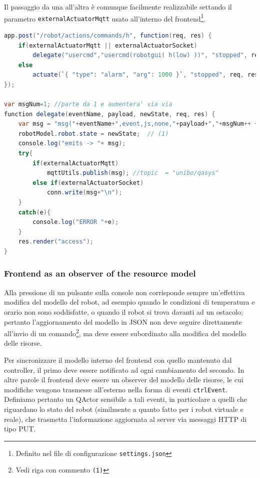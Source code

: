 \documentclass{../llncs}
\newcommand{\codescript}[1]{{\mbox{\small{\texttt{#1}}}}\xspace}
\newcommand{\labelsssec}[1]{\label{sssec:#1}}
\begin{document}
Il passaggio da una all'altra è comunque facilmente realizzabile settando il parametro \codescript{externalActuatorMqtt} usato all'interno del frontend\footnote{Definito nel file di configurazione \texttt{settings.json}}.\\

\begin{lstlisting}[language=java, caption={nodeCode/frontend/applCodeRobot.js}]
app.post("/robot/actions/commands/h", function(req, res) {
	if(externalActuatorMqtt || externalActuatorSocket)
		delegate("usercmd","usercmd(robotgui( h(low) ))", "stopped", req, res);
	else
		actuate(`{ "type": "alarm", "arg": 1000 }`, "stopped", req, res);
});

var msgNum=1; //parte da 1 e aumentera' via via
function delegate(eventName, payload, newState, req, res) {
	var msg = "msg("+eventName+",event,js,none,"+payload+","+msgNum++ +")";
	robotModel.robot.state = newState;	// (1)
	console.log("emits -> "+ msg);
	try{
		if(externalActuatorMqtt)
	 		mqttUtils.publish(msg);	//topic  = "unibo/qasys"
		else if(externalActuatorSocket)
			conn.write(msg+"\n");
	}
	catch(e){
		console.log("ERROR "+e);
	}
	res.render("access");
}
\end{lstlisting}

\subsubsection{Frontend as an observer of the resource model}
\labelsssec{frontendObserver}
Alla pressione di un pulsante sulla console non corrisponde sempre un'effettiva modifica del modello del robot, ad esempio quando le condizioni di temperatura e orario non sono soddisfatte, o quando il robot si trova davanti ad un ostacolo; pertanto l'aggiornamento del modello in JSON non deve seguire direttamente all'invio di un comando\footnote{Vedi riga con commento \texttt{(1)}}, ma deve essere subordinato alla modifica del modello delle risorse.

Per sincronizzare il modello interno del frontend con quello mantenuto dal controller, il primo deve essere notificato ad ogni cambiamento del secondo. In altre parole il frontend deve essere un observer del modello delle risorse, le cui modifiche vengono trasmesse all'esterno nella forma di eventi \codescript{ctrlEvent}.\\

Definiamo pertanto un QActor sensibile a tali eventi, in particolare a quelli che riguardano lo stato del robot (similmente a quanto fatto per i robot virtuale e reale), che trasmetta l'informazione aggiornata al server via messaggi HTTP di tipo PUT.\\
\end{document}
